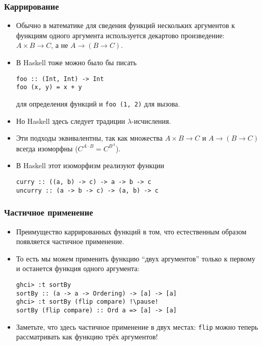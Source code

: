 \documentclass[10pt]{beamer}
\begin{document}
\begin{frame}[fragile]
\frametitle{Каррирование}
\begin{itemize}
    \item Обычно в математике для сведения функций нескольких аргументов к функциям одного аргумента используется декартово произведение: $A \times B \to C$, а не $A \to (B \to C)$.\pause
    \item В Haskell тоже можно было бы писать
\begin{lstlisting}
foo :: (Int, Int) -> Int
foo (x, y) = x + y
\end{lstlisting}
для определения функций и \lstinline|foo (1, 2)| для вызова.\pause
    \item Но Haskell здесь следует традиции $\lambda$-исчисления.\pause
    \item Эти подходы эквивалентны, так как множества $A \times B \to C$ и $A \to (B \to C)$ всегда изоморфны \pause ($C^{A \cdot B} = C^{B^A}$).
    \item В Haskell этот изоморфизм реализуют функции\pause
\begin{lstlisting}
curry :: ((a, b) -> c) -> a -> b -> c
uncurry :: (a -> b -> c) -> (a, b) -> c
\end{lstlisting}
\end{itemize}
\end{frame}

\begin{frame}[fragile]
\frametitle{Частичное применение}
\begin{itemize}
    \item Преимущество каррированных функций в том, что естественным образом появляется частичное применение.
    \item То есть мы можем применить функцию \enquote{двух аргументов} только к первому и останется функция одного аргумента:
\begin{lstlisting}
ghci> :t sortBy
sortBy :: (a -> a -> Ordering) -> [a] -> [a]
ghci> :t sortBy (flip compare) !\pause!
sortBy (flip compare) :: Ord a => [a] -> [a]
\end{lstlisting}\pause
    \item Заметьте, что здесь частичное применение в двух местах: \pause\lstinline|flip| можно теперь рассматривать как функцию трёх аргументов!
\end{itemize}
\end{frame}
\end{document}
